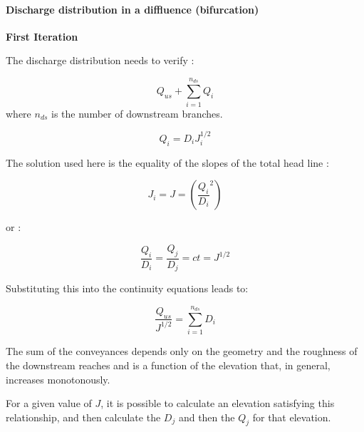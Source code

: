 \paragraph{Discharge distribution in a diffluence (bifurcation)\\}

\hspace*{1cm}

\textbf{First Iteration}

The discharge distribution needs to verify :

\begin{equation}
  Q_{us} + \sum_{i=1}^{n_{ds}} Q_i
\end{equation}
where $n_{ds}$ is the number of downstream branches.

\begin{equation}
  Q_i = D_i J_{i}^{1/2}
\end{equation}

\vspace{0.5cm}

The solution used here is the equality of the slopes of the total head line :

\begin{equation}
  J_i = J = \left ( \frac{Q_i}{D_i}^2 \right )
\end{equation}

or :

\begin{equation}
  \frac{Q_i}{D_i} = \frac{Q_j}{D_j} = ct = J^{1/2}
\end{equation}

\vspace{0.5cm}

Substituting this into the continuity equations leads to:

\begin{equation}
 \frac{Q_{us}}{J^{1/2}} = \sum_{i=1}^{n_{ds}} D_i
\end{equation}

\vspace{0.5cm}

The sum of the conveyances depends only on the geometry and the roughness of the downstream reaches and is a function of the elevation that, in general, increases monotonously.

\vspace{0.5cm}

For a given value of $J$, it is possible to calculate an elevation satisfying this relationship, and then calculate the $D_j$ and then the  $Q_j$ for that elevation.

